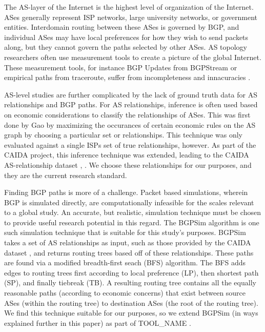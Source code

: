 \documentclass{article}
\newcommand{\toolname}{{\color{blue}TOOL\_NAME }}
\begin{document}
\begin{multicols}{2}
The AS-layer of the Internet is the highest level of organization of the Internet. ASes generally represent ISP networks,
large university networks, or government entities. Interdomain routing between these ASes is governed by BGP, and
individual ASes may have local preferences for how they wish to send packets along, but they cannot govern the paths
selected by other ASes. AS topology researchers often use measurement tools to create a picture of the global Internet.
These measurement tools, for instance BGP Updates from BGPStream \cite{BGPStream} or empirical paths from traceroute, suffer from
incompleteness and innacuracies \cite{tracerouteProblems}.
\par
AS-level studies are further complicated by the lack of ground truth data for AS relationships and BGP paths. For AS relationships,
inference is often used based on economic considerations to classify the relationships of ASes. This was first done by Gao \cite{gao} by
maximizing the occurances of certain economic rules on the AS graph by choosing a particular set or relationships. This technique was only
evaluated against a single ISPs set of true relationships, however. As part of the CAIDA project, this inference technique was extended, leading
to the CAIDA AS-relationship dataset \cite{CAIDApaper}, \cite{CAIDA}. We choose these relationships for our purposes, and they are the current
research standard.
\par
Finding BGP paths is more of a challenge. Packet based simulations, wherein BGP is simulated directly, are computationally infeasible for the
scales relevant to a global study. An accurate, but realistic, simulation technique must be chosen to provide useful research potential in this regard.
The BGPSim algorithm \cite{quicksand} is one such simulation technique that is suitable for this study's purposes. BGPSim takes a set of AS relationships
as input, such as those provided by the CAIDA dataset \cite{CAIDA}, and returns routing trees based off of these relationships. These paths are found via
a modified breadth-first seach (BFS) algorithm. The BFS adds edges to routing trees first according to local preference (LP), then shortest path (SP), and finally tiebreak (TB).
A resulting routing tree contains all the equally reasonable paths (according to economic concerns) that exist between source ASes (within the routing tree) to 
destination ASes (the root of the routing tree). We find this technique suitable for our purposes, so we extend BGPSim 
(in ways explained further in this paper) as part of \toolname.


\end{multicols}
\end{document}
